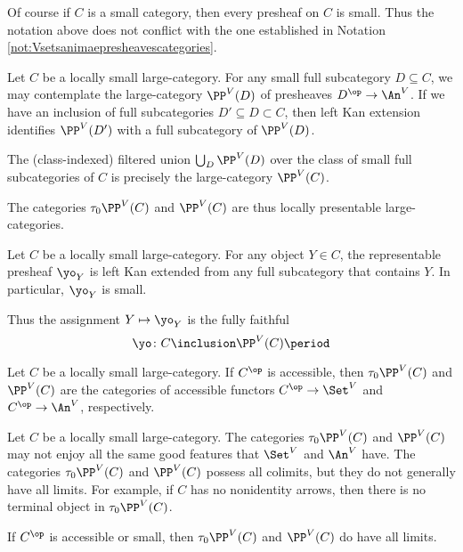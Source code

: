 \begin{eg}
	Of course if $ C $ is a small category, then
	every presheaf on $ C $ is small.
	Thus the notation above does not conflict with the one established in
	Notation \ref{not:Vsetsanimaepresheavescategories}.
\end{eg}

\begin{nul}
	Let $ C $ be a locally small large-category.
	For any small full subcategory $ D \subseteq C $,
	we may contemplate the large-category $ \PP^V(D) $
	of presheaves $ D^{\op} \to \An^V $.
	If we have an inclusion of full subcategories
	$ D' \subseteq D \subset C $, then
	left Kan extension identifies $ \PP^V(D') $ with
	a full subcategory of $ \PP^V(D) $.
	
	The (class-indexed) filtered union
	$ \bigcup_D \PP^V(D) $
	over the class of small full subcategories of $ C $
	is precisely the large-category $ \PP^V(C) $.
	
	The categories $ \tau_0\PP^V(C) $ and $ \PP^V(C) $ are thus
	locally presentable large-categories.
\end{nul}

\begin{eg}
	Let $ C $ be a locally small large-category.
	For any object $ Y \in C $,
	the representable presheaf $ \yo_Y $ is left Kan extended
	from any full subcategory that contains $ Y $.
	In particular, $ \yo_Y $ is small.

	Thus the assignment $ Y \mapsto \yo_Y $ is
	the fully faithful 
	\[ \yo \colon C \inclusion \PP^V(C) \period \]
\end{eg}

\begin{eg}
	Let $ C $ be a locally small large-category.
	If $ C^{\op} $ is accessible,
	then $ \tau_0\PP^V(C) $ and $ \PP^V(C) $
	are the categories of accessible functors
	$ C^{\op} \to \Set^V $ and $ C^{\op} \to \An^V $, respectively.
\end{eg}

\begin{nul}
	Let $ C $ be a locally small large-category.
	The categories $ \tau_0\PP^V(C) $ and $ \PP^V(C) $
	may not enjoy all the same good features that
	$ \Set^V $ and $ \An^V$ have.
	The categories $ \tau_0\PP^V(C) $ and $ \PP^V(C) $
	possess all colimits,
	but they do not generally have all limits.
	For example, if $C$ has no nonidentity arrows, then
	there is no terminal object in $ \tau_0\PP^V(C) $.
	
	If $ C^{\op} $ is accessible or small,
	then $ \tau_0\PP^V(C) $ and $ \PP^V(C) $ do have all limits.
\end{nul}

